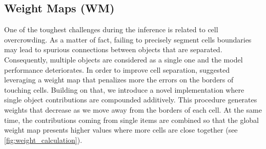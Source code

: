 
\subsection{Weight Maps (WM)} \label{sec:weights_map}

One of the toughest challenges during the inference is related to cell overcrowding. 
As a matter of fact, failing to precisely segment cells boundaries may lead to spurious connections between objects that are separated. Consequently, multiple objects are considered as a single one and the model performance deteriorates.
In order to improve cell separation,  suggested leveraging a weight map that penalizes more the errors on the borders of touching cells.
Building on that, we introduce a novel implementation where single object contributions are compounded additively.
This procedure generates weights that decrease as we move away from the borders of each cell. 
At the same time, the contributions coming from single items are combined so that the global weight map presents higher values where more cells are close together (see \cref{fig:weight_calculation}).
%
